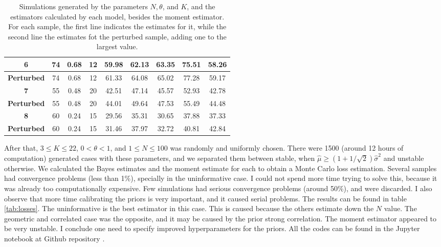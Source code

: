 \begin{table}[!ht]
\begin{tabular}{|c|c|c|c|c|c|c|c|c|}
        6                  & 74           & 0.68        & 12          & 59.98         & 62.13          & 63.35            & 75.51              & 58.26           \\ \hline
        \textbf{Perturbed} & 74           & 0.68        & 12          & 61.33         & 64.08          & 65.02            & 77.28              & 59.17           \\ \hline
        \textbf{7}         & 55           & 0.48        & 20          & 42.51         & 47.14          & 45.57            & 52.93              & 42.78           \\ \hline
        \textbf{Perturbed} & 55           & 0.48        & 20          & 44.01         & 49.64          & 47.53            & 55.49              & 44.48           \\ \hline
        \textbf{8}         & 60           & 0.24        & 15          & 29.56         & 35.31          & 30.65            & 37.88              & 37.33           \\ \hline
        \textbf{Perturbed} & 60           & 0.24        & 15          & 31.46         & 37.97          & 32.72            & 40.81              & 42.84           \\ \hline
        \end{tabular}
    \caption{Simulations generated by the parameters $N, \theta$, and $K$, and the estimators calculated by each model, besides the moment estimator. For each sample, the first line indicates the estimates for it, while the second line the estimates fot the perturbed sample, adding one to the largest value.}
    \label{tab:simulations-estimates}
\end{table}
    
    \ind After that, $3 \le K \le 22$, $0 < \theta < 1$, and $1 \le N \le 100$ was
    randomly and uniformly chosen. There were 1500 (around 12 hours of computation) generated cases with these
    parameters, and we separated them between stable, when $\hat{\mu} \ge (1 +
    1/\sqrt{2})\hat{\sigma}^2$ and unstable otherwise. We calculated the Bayes
    estimates and the moment estimate for each to obtain a Monte Carlo loss
    estimation. Several samples had
    convergence problems (less than 1\%), specially in the uninformative case.
    I could not spend more time trying to solve this, because it was already
    too computationally expensive. Few simulations had serious convergence 
    problems (around 50\%), and were discarded. I also observe that more time
    calibrating the priors is very important, and it caused serial problems.
    The results can be found in table \ref{tab:losses}. The uninformative is
    the best estimator in this case. This is caused because the others
    estimate down the $N$ value. The geometric and correlated case was the
    opposite, and it may be caused by the prior strong correlation. The moment
    estimator appeared to be very unstable. I conclude one need to specify
    improved hyperparameters for the priors. All the codes can be found in the
    Jupyter notebook at Github repository \cite{github}.

